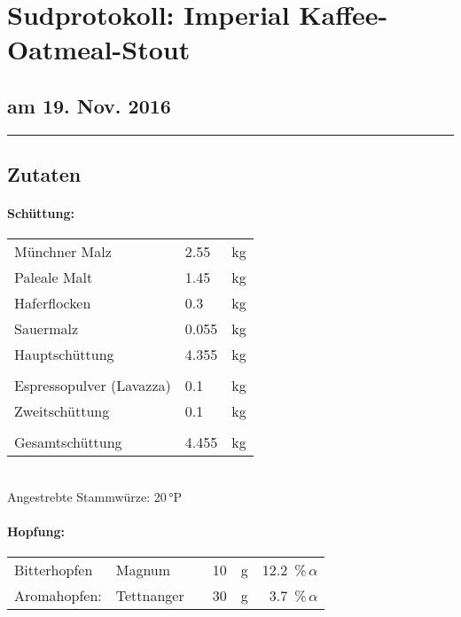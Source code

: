 \documentclass[12pt,oneside,a4paper]{scrartcl}
\begin{document}
	\begin{minipage}[c]{0.70\textwidth}
		\section*{\hspace{-.4cm}Sudprotokoll: Imperial Kaffee-Oatmeal-Stout }
	\end{minipage}
	\begin{minipage}[c]{0.29\textwidth}
		\subsection*{am 19. Nov. 2016}
	\end{minipage}
	\rule{\textwidth}{1pt}
%
\subsection*{Zutaten}
%
\paragraph{Schüttung:}
	\begin{tabular}[t]{m{8cm} m{2cm} m{1cm}}
		Münchner Malz & \num{2,55}  & kg \bigstrut\\
		Paleale Malt & \num{1,45} & kg \bigstrut\\
		Haferflocken & \num{0,3} & kg \bigstrut\\
		Sauermalz & \num{0,055} & kg \bigstrut\\ \hline
		Hauptschüttung & \num{4,355} & kg \bigstrut\\
		&&\\
		Espressopulver (Lavazza) & \num{0,1} & kg \bigstrut\\\hline
		Zweitschüttung & \num{0,1} & kg \bigstrut\\
		&&\\\hline\hline
		Gesamtschüttung & \num{4,455} & kg\bigstrut
	\end{tabular}\\

\vspace{.25cm}
\hspace{1cm}Angestrebte Stammwürze: 20\,°P
%
\paragraph{Hopfung:}
	\begin{tabular}[t]{l l c r r r}
		Bitterhopfen & Magnum &  & \num{10} &  \si{\gram}& \SI{12,2}{\percent}\,$\alpha$ \\
		Aromahopfen: & Tettnanger &  & \num{30} & \si{\gram} & \SI{3,7}{\percent}\,$\alpha$
	\end{tabular}\\
\end{document}
